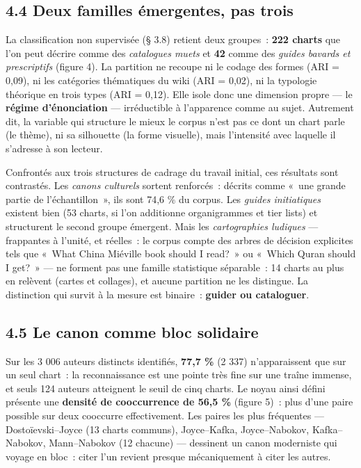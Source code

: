 \documentclass[11pt,a4paper]{article}
\begin{document}
\subsection*{4.4 Deux familles émergentes, pas trois}

La classification non supervisée (§ 3.8) retient deux groupes~: \textbf{222 charts} que l'on peut décrire comme des \emph{catalogues muets} et \textbf{42} comme des \emph{guides bavards et prescriptifs} (figure 4). La partition ne recoupe ni le codage des formes (ARI = 0,09), ni les catégories thématiques du wiki (ARI = 0,02), ni la typologie théorique en trois types (ARI = 0,12). Elle isole donc une dimension propre --- le \textbf{régime d'énonciation} --- irréductible à l'apparence comme au sujet. Autrement dit, la variable qui structure le mieux le corpus n'est pas ce dont un chart parle (le thème), ni sa silhouette (la forme visuelle), mais l'intensité avec laquelle il s'adresse à son lecteur.

Confrontés aux trois structures de cadrage du travail initial, ces résultats sont contrastés. Les \emph{canons culturels} sortent renforcés~: décrits comme «~une grande partie de l'échantillon~», ils sont 74,6 \% du corpus. Les \emph{guides initiatiques} existent bien (53 charts, si l'on additionne organigrammes et tier lists) et structurent le second groupe émergent. Mais les \emph{cartographies ludiques} --- frappantes à l'unité, et réelles~: le corpus compte des arbres de décision explicites tels que «~What China Miéville book should I read?~» ou «~Which Quran should I get?~» --- ne forment pas une famille statistique séparable~: 14 charts au plus en relèvent (cartes et collages), et aucune partition ne les distingue. La distinction qui survit à la mesure est binaire~: \textbf{guider ou cataloguer}.

\subsection*{4.5 Le canon comme bloc solidaire}

Sur les 3 006 auteurs distincts identifiés, \textbf{77,7 \%} (2 337) n'apparaissent que sur un seul chart~: la reconnaissance est une pointe très fine sur une traîne immense, et seuls 124 auteurs atteignent le seuil de cinq charts. Le noyau ainsi défini présente une \textbf{densité de cooccurrence de 56,5 \%} (figure 5)~: plus d'une paire possible sur deux cooccurre effectivement. Les paires les plus fréquentes --- Dostoïevski--Joyce (13 charts communs), Joyce--Kafka, Joyce--Nabokov, Kafka--Nabokov, Mann--Nabokov (12 chacune) --- dessinent un canon moderniste qui voyage en bloc~: citer l'un revient presque mécaniquement à citer les autres.
\end{document}
